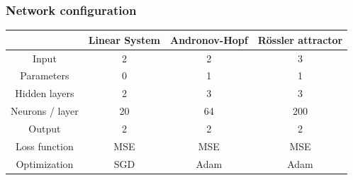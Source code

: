 \begin{frame}
	\frametitle{Network configuration}
	\centering
	\begin{tabular} { c | c | c | c}
		& Linear System & Andronov-Hopf & R\"ossler attractor	\\
		\hline
		Input			& 2 		& 2			& 3			\\
		\hline
		Parameters		& 0			& 1			& 1			\\
		\hline
		Hidden layers	& 2			& 3			& 3			\\
		\hline
		Neurons / layer	& 20		& 64		& 200		\\
		\hline
		Output			& 2			& 2			& 2			\\
		\hline
		Loss function	& MSE		& MSE		& MSE		\\
		\hline
		Optimization	& SGD		& Adam		& Adam		\\
	\end{tabular}
\end{frame}
